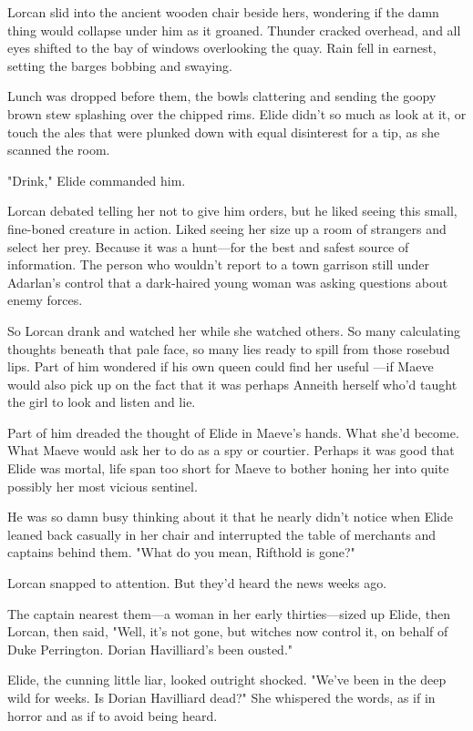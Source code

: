 Lorcan slid into the ancient wooden chair beside hers, wondering if the damn thing would collapse under him as it groaned. Thunder cracked overhead, and all eyes shifted to the bay of windows overlooking the quay. Rain fell in earnest, setting the barges bobbing and swaying.

Lunch was dropped before them, the bowls clattering and sending the goopy brown stew splashing over the chipped rims. Elide didn't so much as look at it, or touch the ales that were plunked down with equal disinterest for a tip, as she scanned the room.

"Drink," Elide commanded him.

Lorcan debated telling her not to give him orders, but  he liked seeing this small, fine-boned creature in action. Liked seeing her size up a room of strangers and select her prey. Because it was a hunt---for the best and safest source of information. The person who wouldn't report to a town garrison still under Adarlan's control that a dark-haired young woman was asking questions about enemy forces.

So Lorcan drank and watched her while she watched others. So many calculating thoughts beneath that pale face, so many lies ready to spill from those rosebud lips. Part of him wondered if his own queen could find her useful ---if Maeve would also pick up on the fact that it was perhaps Anneith herself who'd taught the girl to look and listen and lie.

Part of him dreaded the thought of Elide in Maeve's hands. What she'd become. What Maeve would ask her to do as a spy or courtier. Perhaps it was good that Elide was mortal, life span too short for Maeve to bother honing her into quite possibly her most vicious sentinel.

He was so damn busy thinking about it that he nearly didn't notice when Elide leaned back casually in her chair and interrupted the table of merchants and captains behind them. "What do you mean, Rifthold is gone?"

Lorcan snapped to attention. But they'd heard the news weeks ago.

The captain nearest them---a woman in her early thirties---sized up Elide, then Lorcan, then said, "Well, it's not gone, but 
witches now control it, on behalf of Duke Perrington. Dorian Havilliard's been ousted."

Elide, the cunning little liar, looked outright shocked. "We've been in the deep wild for weeks. Is Dorian Havilliard dead?" She whispered the words, as if in horror  and as if to avoid being heard.

